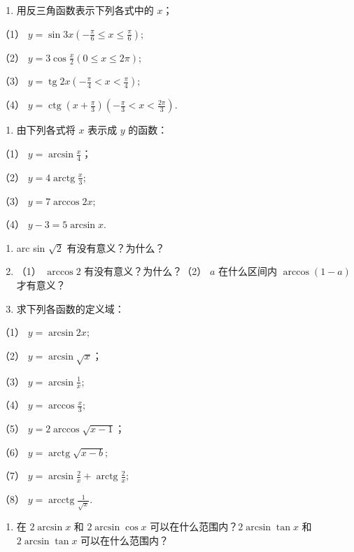 \begin{enumerate}
\item
  用反三角函数表示下列各式中的 \(x\)；
\end{enumerate}

（1）
\(y = \sin 3x\left(-\frac{\pi}{6} \leqslant x \leqslant \frac{\pi}{6}\right);\)

（2） \(y = 3\cos \frac{x}{2} (0 \leqslant x \leqslant 2\pi);\)

（3）
\(y = \operatorname{tg} 2x\left(-\frac{\pi}{4} < x < \frac{\pi}{4}\right);\)

（4）
\(y = \operatorname{ctg}\left(x + \frac{\pi}{3}\right)\left(-\frac{\pi}{3} < x < \frac{2\pi}{3}\right).\)

\begin{enumerate}[start=2]
\item
  由下列各式将 \(x\) 表示成 \(y\) 的函数：
\end{enumerate}

（1） \(y = \arcsin \frac{x}{4}\)；

（2） \(y = 4\operatorname{arctg} \frac{x}{3};\)

（3） \(y = 7 \arccos 2x;\)

（4） \(y - 3 = 5\arcsin x.\)

\begin{enumerate}[start=3]
\item
  arc sin \(\sqrt{2}\) 有没有意义？为什么？
\item
  （1） \(\arccos 2\) 有没有意义？为什么？（2） \(a\) 在什么区间内
  \(\arccos(1 - a)\) 才有意义？
\item
  求下列各函数的定义域：
\end{enumerate}

（1） \(y = \arcsin 2x;\)

（2） \(y = \arcsin \sqrt{x}\)；

（3） \(y = \arcsin \frac{1}{x};\)

（4） \(y = \arccos \frac{x}{3};\)

（5） \(y = 2 \arccos \sqrt{x - 1}\)；

（6） \(y = \operatorname{arctg}\sqrt{x - b};\)

（7） \(y = \arcsin \frac{2}{x} + \operatorname{arctg} \frac{2}{x};\)

（8） \(y = \operatorname{arcctg} \frac{1}{\sqrt{x}}\).

\begin{enumerate}[start=6]
\item
  在 \(2 \arcsin x\) 和 \(2 \arcsin \cos x\)
  可以在什么范围内？\(2 \arcsin \tan x\) 和 \(2 \arcsin \tan x\)
  可以在什么范围内？
\end{enumerate}

